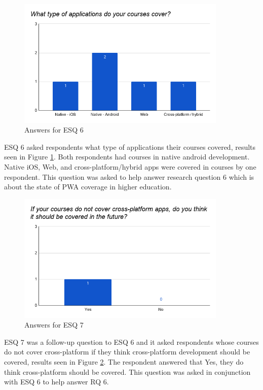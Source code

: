 \documentclass[a4paper,12pt]{article}
\begin{document}
\begin{figure}[ht!]
    \centering
    \includegraphics[width=10cm]{img/Results/esq6.png}
    \caption{Answers for ESQ 6}
    \label{fig:res_eduq6}
\end{figure}

\newpage
ESQ 6 asked respondents what type of applications their courses covered, results seen in Figure \ref{fig:res_eduq6}. Both respondents had courses in native android development. Native iOS, Web, and cross-platform/hybrid apps were covered in courses by one respondent. This question was asked to help answer research question 6 which is about the state of PWA coverage in higher education.

\begin{figure}[ht!]
    \centering
    \includegraphics[width=10cm]{img/Results/esq7.png}
    \caption{Answers for ESQ 7}
    \label{fig:res_eduq7}
\end{figure}

ESQ 7 was a follow-up question to ESQ 6 and it asked respondents whose courses do not cover cross-platform if they think cross-platform development should be covered, results seen in Figure \ref{fig:res_eduq7}. The respondent answered that Yes, they do think cross-platform should be covered. This question was asked in conjunction with ESQ 6 to help answer RQ 6.
\end{document}
